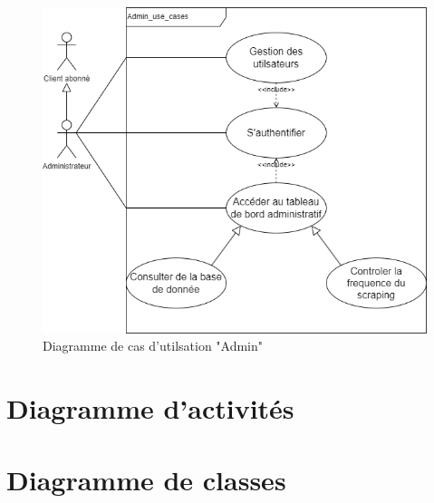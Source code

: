 \documentclass[a4paper,12pt]{report}
\numberwithin{equation}{section}
\begin{document}
\newpage
\vspace*{3.5cm}
\begin{figure}[h]
    \centering
        \includegraphics[width=\textwidth]{uml-Admin.png}
    \caption{Diagramme de cas d'utilsation "Admin"}
\end{figure}

\newpage

\section{Diagramme d'activités}
\vspace{0.5cm}
\section{Diagramme de classes}
\vspace{0.5cm}
 
\end{document}
